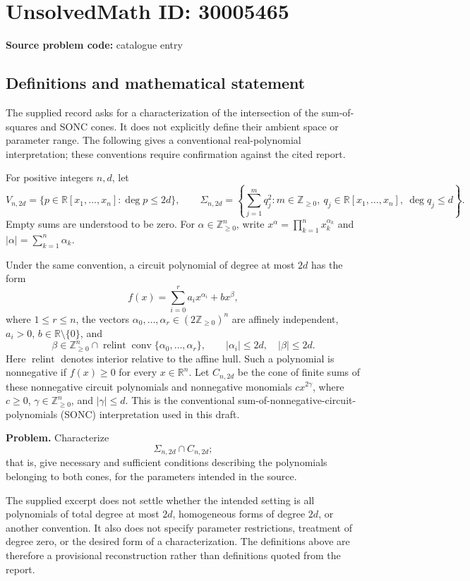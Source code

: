 \documentclass[11pt]{article}
\newcommand{\Z}{\mathbb{Z}}
\newcommand{\R}{\mathbb{R}}
\begin{document}
\section*{UnsolvedMath ID: 30005465}
\textbf{Source problem code:} catalogue entry
\subsection{Definitions and mathematical statement}
The supplied record asks for a characterization of the intersection of the sum-of-squares and SONC cones. It does not explicitly define their ambient space or parameter range. The following gives a conventional real-polynomial interpretation; these conventions require confirmation against the cited report.

For positive integers \(n,d\), let
\[
V_{n,2d}=\{p\in\R[x_1,\ldots,x_n]:\deg p\leq 2d\},
\qquad
\Sigma_{n,2d}=\left\{\sum_{j=1}^{m}q_j^2:m\in\Z_{\geq0},\ q_j\in\R[x_1,\ldots,x_n],\ \deg q_j\leq d\right\}.
\]
Empty sums are understood to be zero. For \(\alpha\in\Z_{\geq0}^{n}\), write \(x^\alpha=\prod_{k=1}^{n}x_k^{\alpha_k}\) and \(|\alpha|=\sum_{k=1}^{n}\alpha_k\).

Under the same convention, a circuit polynomial of degree at most \(2d\) has the form
\[
f(x)=\sum_{i=0}^{r}a_i x^{\alpha_i}+b x^\beta,
\]
where \(1\leq r\leq n\), the vectors \(\alpha_0,\ldots,\alpha_r\in(2\Z_{\geq0})^n\) are affinely independent, \(a_i>0\), \(b\in\R\setminus\{0\}\), and
\[
\beta\in\Z_{\geq0}^{n}\cap\operatorname{relint}\operatorname{conv}\{\alpha_0,\ldots,\alpha_r\},
\qquad |\alpha_i|\leq2d,\quad |\beta|\leq2d.
\]
Here \(\operatorname{relint}\) denotes interior relative to the affine hull. Such a polynomial is nonnegative if \(f(x)\geq0\) for every \(x\in\R^n\). Let \(C_{n,2d}\) be the cone of finite sums of these nonnegative circuit polynomials and nonnegative monomials \(c x^{2\gamma}\), where \(c\geq0\), \(\gamma\in\Z_{\geq0}^{n}\), and \(|\gamma|\leq d\). This is the conventional sum-of-nonnegative-circuit-polynomials (SONC) interpretation used in this draft.

\textbf{Problem.} Characterize
\[
\Sigma_{n,2d}\cap C_{n,2d};
\]
that is, give necessary and sufficient conditions describing the polynomials belonging to both cones, for the parameters intended in the source.

The supplied excerpt does not settle whether the intended setting is all polynomials of total degree at most \(2d\), homogeneous forms of degree \(2d\), or another convention. It also does not specify parameter restrictions, treatment of degree zero, or the desired form of a characterization. The definitions above are therefore a provisional reconstruction rather than definitions quoted from the report.
\end{document}
